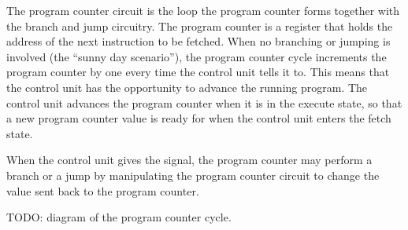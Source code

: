 The program counter circuit is the loop the program counter forms together with the branch and jump circuitry.
The program counter is a register that holds the address of the next instruction to be fetched.
When no branching or jumping is involved (the ``sunny day scenario''), the program counter cycle increments the program counter by one every time the control unit tells it to.
This means that the control unit has the opportunity to advance the running program.
The control unit advances the program counter when it is in the execute state, so that a new program counter value is ready for when the control unit enters the fetch state.

When the control unit gives the signal, the program counter may perform a branch or a jump by manipulating the program counter circuit to change the value sent back to the program counter.

TODO: diagram of the program counter cycle.

